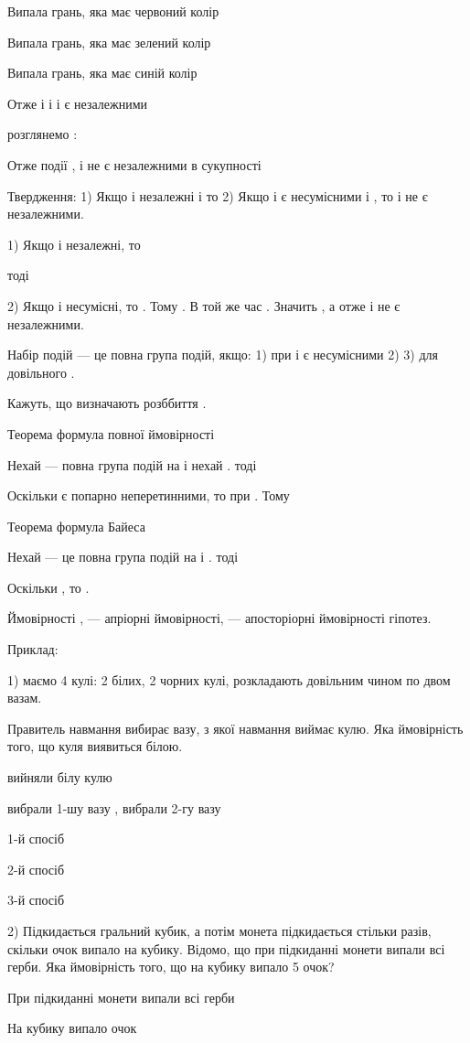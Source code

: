 Випала грань, яка має червоний колір

Випала грань, яка має зелений колір

Випала грань, яка має синій колір

Отже і  і  і  є незалежними

розглянемо  :

Отже події ,  і  не є незалежними в сукупності

Твердження:
1) Якщо  і  незалежні і  то
2) Якщо  і  є несумісними і  , то  і  не є незалежними.


1) Якщо  і  незалежні, то

тоді

2) Якщо  і  несумісні, то  . Тому  . В той же час .
Значить  , а отже  і  не є незалежними.


Набір подій  --- це повна група подій, якщо:
1)  при   і   є несумісними
2) 
3) для довільного .

Кажуть, що  визначають розббиття  .

Теорема формула повної ймовірності

Нехай  --- повна група подій на і нехай  . тоді


Оскільки  є попарно неперетинними, то 
при  . Тому

Теорема  формула Байеса

Нехай  --- це повна група подій на і  . тоді

Оскільки   ,  то .

Ймовірності ,  --- апріорні ймовірності,  --- апосторіорні
ймовірності гіпотез.

Приклад:

1) маємо 4 кулі: 2 білих, 2 чорних кулі, розкладають
довільним чином по двом вазам.

Правитель навмання вибирає вазу, з якої навмання виймає кулю.
Яка ймовірність того, що куля виявиться білою.

вийняли білу кулю

вибрали 1-шу вазу  ,  вибрали 2-гу вазу

1-й спосіб

2-й спосіб

3-й спосіб

2) Підкидається гральний кубик, а потім монета підкидається
стільки разів, скільки очок випало на кубику. Відомо, що
при підкиданні монети випали всі герби. Яка ймовірність
того, що на кубику випало 5 очок?

При підкиданні монети випали всі герби

На кубику випало  очок

